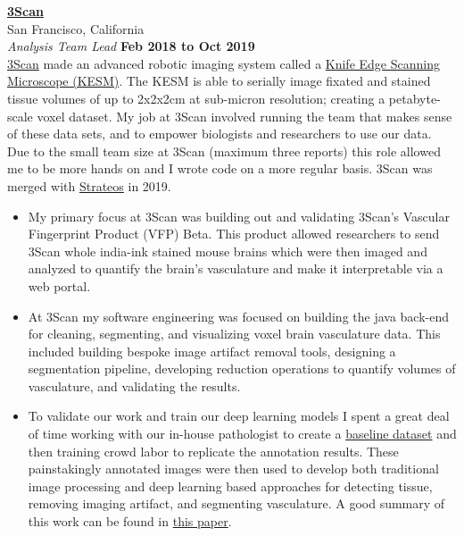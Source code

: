 \documentclass[10pt]{article}
\newenvironment{outerlist}[1][\enskip\textbullet]%
        {\begin{itemize}[#1]}{\end{itemize}%
         \vspace{-.6\baselineskip}}
\newcommand{\blankline}{\quad\pagebreak[2]}
\begin{document}
\blankline
\newline
\href{http://www.3Scan.com/}{\textbf{3Scan}} \\
San Francisco, California \\
\textit{Analysis Team Lead}%
        \hfill \textbf{Feb 2018 to Oct 2019}  \\

\href{http://www.3can.com}{3Scan} made an advanced robotic imaging system called a \href{https://youtu.be/GBj9hTrN0Yk}{Knife Edge Scanning Microscope (KESM)}. The KESM is able to serially image fixated and stained tissue volumes of up to 2x2x2cm at sub-micron resolution; creating a petabyte-scale voxel dataset. My job at 3Scan involved running the team that makes sense of these data sets, and to empower biologists and researchers to use our data. Due to the small team size at 3Scan (maximum three reports) this role allowed me to be more hands on and I wrote code on a more regular basis. 3Scan was merged with \href{https://strateos.com/}{Strateos} in 2019.  
\begin{outerlist}
\item My primary focus at 3Scan was building out and validating 3Scan's Vascular Fingerprint Product (VFP) Beta. This product allowed researchers to send 3Scan whole india-ink stained mouse brains which were then imaged and analyzed to quantify the brain's vasculature and make it interpretable via a web portal. 
\item At 3Scan my software engineering was focused on building the java back-end for cleaning, segmenting, and visualizing voxel brain vasculature data. This included building bespoke image artifact removal tools, designing a segmentation pipeline, developing reduction operations to quantify volumes of vasculature, and validating the results. 
\item To validate our work and train our deep learning models I spent a great deal of time working with our in-house pathologist to create a \href{http://www.3scan.com/open-data/}{baseline dataset} and then training crowd labor to replicate the annotation results. These painstakingly annotated images were then used to develop both traditional image processing and deep learning based approaches for detecting tissue, removing imaging artifact, and segmenting vasculature. A good summary of this work can be found in \href{https://github.com/osbd/osbd-2018/raw/master/proceedings/S09204_4274.pdf}{this paper}. 
\end{outerlist}
\blankline
\newline
\end{document}
